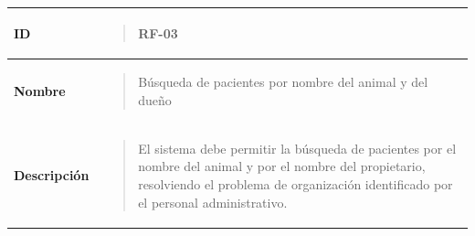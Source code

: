 \documentclass[
]{article}
\newcounter{none} %
\begin{document}
{\def\LTcaptype{none} %
\begin{longtable}[]{@{}
  >{\raggedright\arraybackslash}p{}
  >{\raggedright\arraybackslash}p{}@{}}
\toprule\noalign{}
\begin{minipage}[b]{\linewidth}\raggedright
\textbf{ID}
\end{minipage} & \begin{minipage}[b]{\linewidth}\raggedright
\begin{quote}
RF-03
\end{quote}
\end{minipage} \\
\midrule\noalign{}
\endhead
\bottomrule\noalign{}
\endlastfoot
\textbf{Nombre} & \begin{minipage}[t]{\linewidth}\raggedright
\begin{quote}
Búsqueda de pacientes por nombre del animal y del dueño
\end{quote}
\end{minipage} \\
\textbf{Descripción} & \begin{minipage}[t]{\linewidth}\raggedright
\begin{quote}
El sistema debe permitir la búsqueda de pacientes por el nombre del
animal y por el nombre del propietario, resolviendo el problema de
organización identificado por el personal administrativo.
\end{quote}
\end{minipage} \\
\end{longtable}
}
\end{document}

